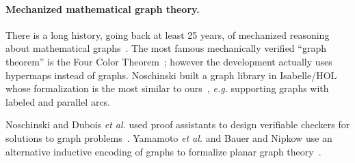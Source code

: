 \paragraph{Mechanized mathematical graph theory.} There is a long history,
going back at least 25 years, of mechanized reasoning about mathematical
graphs~\cite{wong1991}.  The most famous mechanically verified ``graph theorem''
is the Four Color Theorem~\cite{gonthier2005computer}; however
the development actually uses hypermaps instead of graphs.
Noschinski built a graph library in Isabelle/HOL whose formalization
is the most similar to ours~\cite{Noschinski2015}, \emph{e.g.} supporting
graphs with labeled and parallel arcs.

Noschinski and Dubois \emph{et al.} used proof assistants to design verifiable
checkers for solutions to graph problems~\cite{noschinski2015formalizing,dubois2015graphes}.
Yamamoto \emph{et al.} and Bauer and Nipkow use an alternative inductive
encoding of graphs to formalize planar graph theory~\cite{yamamoto1995formalization,bauer20025}.




